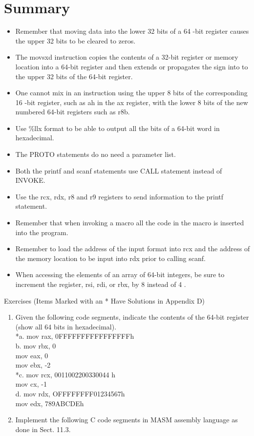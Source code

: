 \documentclass[10pt]{book}
\begin{document}
\section{Summary}
\begin{itemize}
  \item Remember that moving data into the lower 32 bits of a 64 -bit register causes the upper 32 bits to be cleared to zeros.
  \item The movsxd instruction copies the contents of a 32-bit register or memory location into a 64-bit register and then extends or propagates the sign into to the upper 32 bits of the 64-bit register.
  \item One cannot mix in an instruction using the upper 8 bits of the corresponding 16 -bit register, such as ah in the ax register, with the lower 8 bits of the new numbered 64-bit registers such as r8b.
  \item Use \%llx format to be able to output all the bits of a 64-bit word in hexadecimal.
  \item The PROTO statements do no need a parameter list.
  \item Both the printf and scanf statements use CALL statement instead of INVOKE.
  \item Use the rcx, rdx, r8 and r9 registers to send information to the printf statement.
  \item Remember that when invoking a macro all the code in the macro is inserted into the program.
  \item Remember to load the address of the input format into rcx and the address of the memory location to be input into rdx prior to calling scanf.
  \item When accessing the elements of an array of 64-bit integers, be sure to increment the register, rsi, rdi, or rbx, by 8 instead of 4 .
\end{itemize}

Exercises (Items Marked with an * Have Solutions in Appendix D)
\begin{enumerate}
  \item Given the following code segments, indicate the contents of the 64-bit register (show all 64 bits in hexadecimal).\\

*a. mov rax, 0FFFFFFFFFFFFFFFFh\\
b. mov rbx, 0\\
mov eax, 0\\
mov ebx, -2\\
*c. mov rcx, 0011002200330044 h\\
mov cx, -1\\
d. mov rdx, OFFFFFFFF01234567h\\
mov edx, 789ABCDEh
  \item Implement the following C code segments in MASM assembly language as done in Sect. 11.3.
\end{enumerate}
\end{document}
